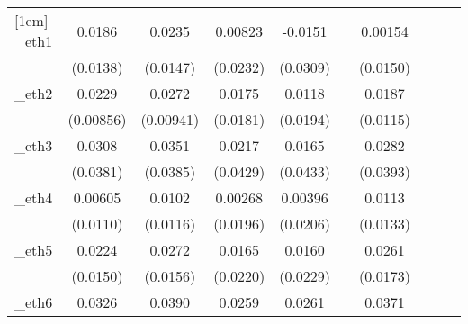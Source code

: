 \begin{table}[htbp]
\begin{tabular}{l*{9}{c}}
[1em]
\_eth1       &      0.0186         &      0.0235         &     0.00823         &     -0.0151         &                     &     0.00154         &                     &                     &                     \\
            &    (0.0138)         &    (0.0147)         &    (0.0232)         &    (0.0309)         &                     &    (0.0150)         &                     &                     &                     \\
[1em]
\_eth2       &      0.0229\sym{***}&      0.0272\sym{***}&      0.0175         &      0.0118         &                     &      0.0187         &                     &                     &                     \\
            &   (0.00856)         &   (0.00941)         &    (0.0181)         &    (0.0194)         &                     &    (0.0115)         &                     &                     &                     \\
[1em]
\_eth3       &      0.0308         &      0.0351         &      0.0217         &      0.0165         &                     &      0.0282         &                     &                     &                     \\
            &    (0.0381)         &    (0.0385)         &    (0.0429)         &    (0.0433)         &                     &    (0.0393)         &                     &                     &                     \\
[1em]
\_eth4       &     0.00605         &      0.0102         &     0.00268         &     0.00396         &                     &      0.0113         &                     &                     &                     \\
            &    (0.0110)         &    (0.0116)         &    (0.0196)         &    (0.0206)         &                     &    (0.0133)         &                     &                     &                     \\
[1em]
\_eth5       &      0.0224         &      0.0272\sym{*}  &      0.0165         &      0.0160         &                     &      0.0261         &                     &                     &                     \\
            &    (0.0150)         &    (0.0156)         &    (0.0220)         &    (0.0229)         &                     &    (0.0173)         &                     &                     &                     \\
[1em]
\_eth6       &      0.0326         &      0.0390         &      0.0259         &      0.0261         &                     &      0.0371         &                     &                     &                     \\

\end{tabular}
\end{table}
